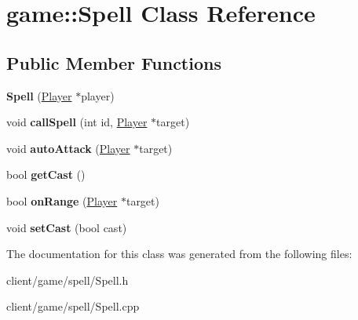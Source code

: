 \hypertarget{classgame_1_1_spell}{\section{game\-:\-:Spell Class Reference}
\label{classgame_1_1_spell}
}
\subsection*{Public Member Functions}
\begin{DoxyCompactItemize}
\item 
\hypertarget{classgame_1_1_spell_ae370314cc4642483665693b236f434a8}{{\bfseries Spell} (\hyperlink{classgame_1_1_player}{Player} $\ast$player)}\label{classgame_1_1_spell_ae370314cc4642483665693b236f434a8}

\item 
\hypertarget{classgame_1_1_spell_a5ed9273cac6a819ce18eb53f38475cb5}{void {\bfseries call\-Spell} (int id, \hyperlink{classgame_1_1_player}{Player} $\ast$target)}\label{classgame_1_1_spell_a5ed9273cac6a819ce18eb53f38475cb5}

\item 
\hypertarget{classgame_1_1_spell_a57aba6147630082f25575f84d6f264e7}{void {\bfseries auto\-Attack} (\hyperlink{classgame_1_1_player}{Player} $\ast$target)}\label{classgame_1_1_spell_a57aba6147630082f25575f84d6f264e7}

\item 
\hypertarget{classgame_1_1_spell_a7f31d05ff6ce2a2dbdc814e48d0cff1b}{bool {\bfseries get\-Cast} ()}\label{classgame_1_1_spell_a7f31d05ff6ce2a2dbdc814e48d0cff1b}

\item 
\hypertarget{classgame_1_1_spell_adfd676623a4aab370bf83ddc67ed0fde}{bool {\bfseries on\-Range} (\hyperlink{classgame_1_1_player}{Player} $\ast$target)}\label{classgame_1_1_spell_adfd676623a4aab370bf83ddc67ed0fde}

\item 
\hypertarget{classgame_1_1_spell_aa9c10bd1f96cef3d61c7a995e06862ce}{void {\bfseries set\-Cast} (bool cast)}\label{classgame_1_1_spell_aa9c10bd1f96cef3d61c7a995e06862ce}

\end{DoxyCompactItemize}


The documentation for this class was generated from the following files\-:\begin{DoxyCompactItemize}
\item 
client/game/spell/Spell.\-h\item 
client/game/spell/Spell.\-cpp\end{DoxyCompactItemize}
